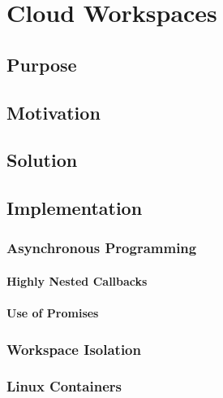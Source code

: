 \chapter{Cloud Workspaces}

\section{Purpose}

\section{Motivation}

\section{Solution}

\section{Implementation}

\subsection{Asynchronous Programming}
\subsubsection{Highly Nested Callbacks}
\subsubsection{Use of Promises}

\subsection{Workspace Isolation}
\subsection{Linux Containers}
